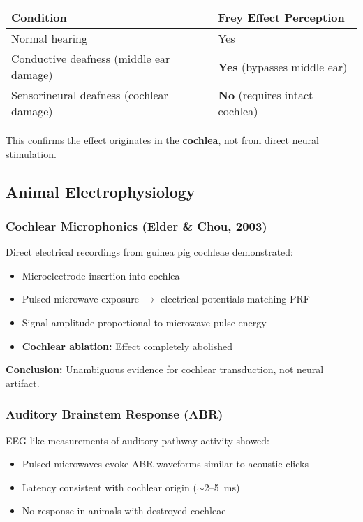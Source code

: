 \begin{center}
\begin{tabular}{@{}ll@{}}
\toprule
\textbf{Condition} & \textbf{Frey Effect Perception} \\
\midrule
Normal hearing & Yes \\
Conductive deafness (middle ear damage) & \textbf{Yes} (bypasses middle ear) \\
Sensorineural deafness (cochlear damage) & \textbf{No} (requires intact cochlea) \\
\bottomrule
\end{tabular}
\end{center}

This confirms the effect originates in the \textbf{cochlea}, not from direct neural stimulation.

\subsection{Animal Electrophysiology}

\subsubsection{Cochlear Microphonics (Elder \& Chou, 2003)}

Direct electrical recordings from guinea pig cochleae demonstrated:
\begin{itemize}
\item Microelectrode insertion into cochlea
\item Pulsed microwave exposure $\rightarrow$ electrical potentials matching PRF
\item Signal amplitude proportional to microwave pulse energy
\item \textbf{Cochlear ablation:} Effect completely abolished
\end{itemize}

\textbf{Conclusion:} Unambiguous evidence for cochlear transduction, not neural artifact.

\subsubsection{Auditory Brainstem Response (ABR)}

EEG-like measurements of auditory pathway activity showed:
\begin{itemize}
\item Pulsed microwaves evoke ABR waveforms similar to acoustic clicks
\item Latency consistent with cochlear origin ($\sim$2--5~ms)
\item No response in animals with destroyed cochleae
\end{itemize}

